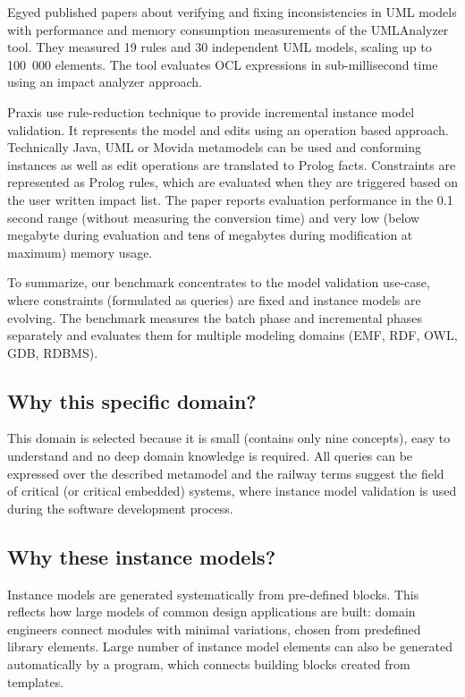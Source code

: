 Egyed published papers about verifying and fixing inconsistencies in UML models
\cite{Egyed-fixingInconsistencies, Egyed-instantConsistency} with performance
and memory consumption measurements \cite{Egyed-incConsistency} of the
UMLAnalyzer tool. They measured 19 rules and 30 independent UML models, scaling
up to 100\ 000 elements. The tool evaluates OCL expressions in sub-millisecond
time using an impact analyzer approach.

Praxis \cite{falleri-praxis} use rule-reduction technique to provide incremental
instance model validation. It represents the model and edits using an operation
based approach. Technically Java, UML or Movida metamodels can be used and
conforming instances as well as edit operations are translated to Prolog facts.
Constraints are represented as Prolog rules, which are evaluated when they are
triggered based on the user written impact list. The paper reports evaluation
performance in the 0.1 second range (without measuring the conversion time) and
very low (below megabyte during evaluation and tens of megabytes during
modification at maximum) memory usage.

To summarize, our benchmark concentrates to the model validation use-case, where
constraints (formulated as queries) are fixed and instance models are evolving.
The benchmark measures the batch phase and incremental phases separately and
evaluates them for multiple modeling domains (EMF, RDF, OWL, GDB, RDBMS).


\subsection{Why this specific domain?}
This domain is selected because it is small (contains only nine concepts), easy
to understand and no deep domain knowledge is required. All queries can be
expressed over the described metamodel and the railway terms suggest the field
of critical (or critical embedded) systems, where instance model validation is
used during the software development process.

\subsection{Why these instance models?}
Instance models are generated systematically from pre-defined blocks. This
reflects how large models of common design applications are built: domain
engineers connect modules with minimal variations, chosen from predefined
library elements. Large number of instance model elements can also be
generated automatically by a program, which connects building blocks created from
templates.

